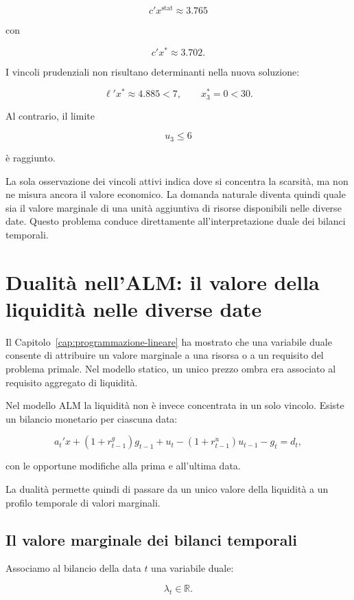 \[
c'x^{\mathrm{stat}}
\approx
3.765
\]

\noindent con

\[
c'x^*
\approx
3.702.
\]

I vincoli prudenziali non risultano determinanti nella nuova soluzione:

\[
\ell'x^*
\approx
4.885
<
7,
\qquad
x_3^*=0<30.
\]

Al contrario, il limite

\[
u_3\leq6
\]

\noindent \`e raggiunto.

La sola osservazione dei vincoli attivi indica dove si concentra la scarsit\`a,
ma non ne misura ancora il valore economico. La domanda naturale diventa
quindi quale sia il valore marginale di una unit\`a aggiuntiva di risorse
disponibili nelle diverse date. Questo problema conduce direttamente
all'interpretazione duale dei bilanci temporali.

\section{Dualit\`a nell'ALM: il valore della liquidit\`a nelle diverse date}

\label{sec:cap12-dualita-alm}

Il Capitolo~\ref{cap:programmazione-lineare} ha mostrato che una variabile
duale consente di attribuire un valore marginale a una risorsa o a un
requisito del problema primale. Nel modello statico, un unico prezzo ombra
era associato al requisito aggregato di liquidit\`a.

Nel modello ALM la liquidit\`a non \`e invece concentrata in un solo vincolo.
Esiste un bilancio monetario per ciascuna data:

\[
a_t'x
+
(1+r^g_{t-1})g_{t-1}
+
u_t
-
(1+r^u_{t-1})u_{t-1}
-
g_t
=
d_t,
\]

\noindent con le opportune modifiche alla prima e all'ultima data.

La dualit\`a permette quindi di passare da un unico valore della liquidit\`a
a un profilo temporale di valori marginali.

\subsection{Il valore marginale dei bilanci temporali}

Associamo al bilancio della data $t$ una variabile duale:

\[
\lambda_t\in\mathbb{R}.
\]

